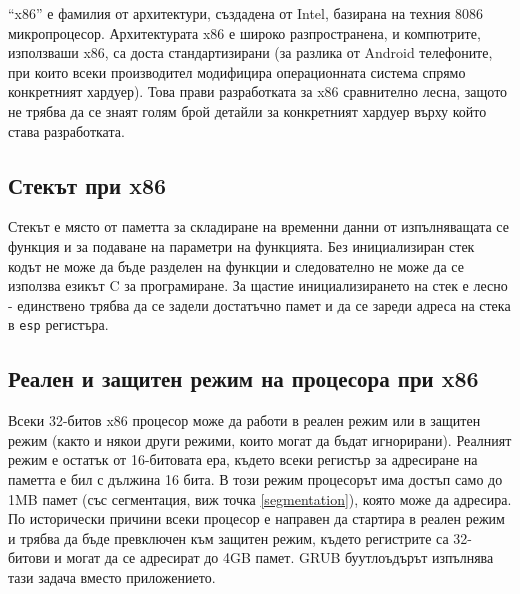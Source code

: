   ``x86'' е фамилия от архитектури, създадена от Intel, базирана на техния 8086 микропроцесор.\cite[глава~2.1]{intel-manual-1} Архитектурата x86 е широко разпространена, и компютрите, използваши x86, са доста стандартизирани (за разлика от Android телефоните, при които всеки производител модифицира операционната система спрямо конкретният хардуер). %
  Това прави разработката за x86 сравнително лесна, защото не трябва да се знаят голям брой детайли за конкретният хардуер върху който става разработката.


  \subsection{Стекът при x86}
  Стекът е място от паметта за складиране на временни данни от изпълняващата се функция и за подаване на параметри на функцията. Без инициализиран стек кодът не може да бъде разделен на функции и следователно не може да се използва езикът C за програмиране. За щастие инициализирането на стек е лесно - единствено трябва да се задели достатъчно памет и да се зареди адреса на стека в {\tt esp} регистъра.

  \subsection{Реален и защитен режим на процесора при x86} \label{processormodes}
  Всеки 32-битов x86 процесор може да работи в реален режим или в защитен режим\cite{intel-manual-1} (както и някои други режими, които могат да бъдат игнорирани). Реалният режим е остатък от 16-битовата ера, където всеки регистър за адресиране на паметта е бил с дължина 16 бита. В този режим процесорът има достъп само до 1MB памет (със сегментация, виж точка \ref{segmentation}), която може да адресира. По исторически причини всеки процесор е направен да стартира в реален режим и трябва да бъде превключен към защитен режим, където регистрите са 32-битови и могат да се адресират до 4GB памет. GRUB буутлоъдърът изпълнява тази задача вместо приложението.

